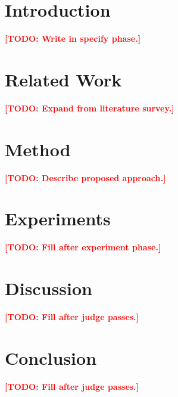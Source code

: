 \documentclass[11pt]{article}
\title{\todo{Title}}
\author{\todo{Authors}}
\date{\today}
\newcommand{\todo}[1]{\textcolor{red}{\textbf{[TODO: #1]}}}
\begin{document}
\maketitle

\begin{abstract}
\todo{Write in specify phase.}
\end{abstract}

\section{Introduction}
\todo{Write in specify phase.}

\section{Related Work}
\todo{Expand from literature survey.}

\section{Method}
\todo{Describe proposed approach.}

\section{Experiments}
\todo{Fill after experiment phase.}

\section{Discussion}
\todo{Fill after judge passes.}

\section{Conclusion}
\todo{Fill after judge passes.}



\end{document}
